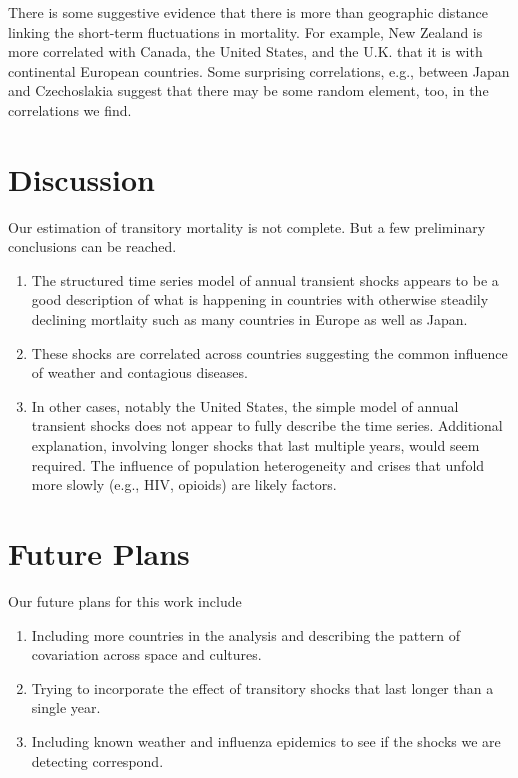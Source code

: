 \documentclass[12pt]{article}
\begin{document}
There is some suggestive evidence that there is more than geographic
distance linking the short-term fluctuations in mortality. For
example, New Zealand is  more correlated with Canada, the United
States, and the U.K. that it is with continental European countries.
Some surprising correlations, e.g., between Japan and Czechoslakia
suggest that there may be some random element, too, in the
correlations we find.



\section{Discussion}

Our estimation of transitory mortality is not complete. But a few
preliminary conclusions can be reached.

\begin{enumerate}

\item The structured time series model of annual transient shocks
  appears to be a good description of what is happening in countries
  with otherwise steadily declining mortlaity such as many countries
  in Europe as well as Japan.

  \item These shocks are correlated across countries suggesting the
    common influence of weather and contagious diseases.

  \item In other cases, notably the United States, the simple model of
    annual transient shocks does not appear to fully describe the time
    series. Additional explanation, involving longer shocks that last
    multiple years, would seem required. The influence of population
    heterogeneity and crises that unfold more slowly (e.g., HIV,
    opioids) are likely factors.

  \end{enumerate}


  \section{Future Plans}

  Our future plans for this work include

  \begin{enumerate}

  \item Including more countries in the analysis and describing the
    pattern of covariation across space and cultures.

  \item Trying to incorporate the effect of transitory shocks that
    last longer than a single year.

  \item Including known weather and influenza epidemics
    to see if the shocks we are detecting correspond.
  \end{enumerate}
  
\end{document}
